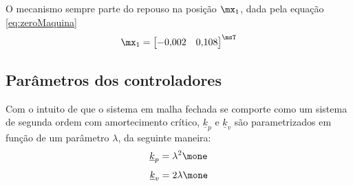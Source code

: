 \documentclass[]{politex}
\begin{document}
O mecanismo sempre parte do repouso na posição $\mx_1$, dada pela equação \eqref{eq:zeroMaquina}
\begin{equation} \label{eq:zeroMaquina}
\mx_1 = \begin{bmatrix}
-0{,}002 & 0{,}108 
\end{bmatrix}^\msT
\end{equation}

\subsection{Parâmetros dos controladores}

Com o intuito de que o sistema em malha fechada se comporte como um sistema de segunda ordem com amortecimento crítico, $\underline{k}_p$ e $\underline{k}_v$ são parametrizados em função de um parâmetro $\lambda$, da seguinte maneira:
\begin{equation}
\underline{k}_p = \lambda^2 \mone
\end{equation}
\begin{equation}
\underline{k}_v = 2 \lambda \mone
\end{equation}
\end{document}
